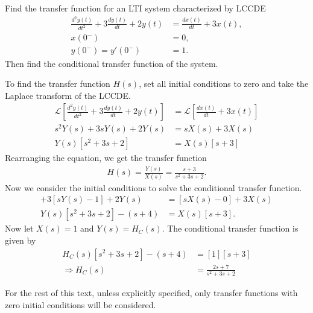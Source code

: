 \documentclass{report}
\begin{document}
\begin{example}
    Find the transfer function for an LTI system characterized by LCCDE
    \begin{align*}
        \frac{d^2y(t)}{dt^2} + 3\frac{dy(t)}{dt} + 2y(t) &= \frac{dx(t)}{dt} + 3x(t), \\
        x(0^-) &= 0, \\
        y(0^-)=y'(0^-) &= 1.
    \end{align*}
    Then find the conditional transfer function of the system.
\end{example}
\begin{solution}
    To find the transfer function $H(s)$, set all initial conditions to zero and take the Laplace transform of the LCCDE.
    \begin{align*}
        \mathcal{L}\left[\frac{d^2y(t)}{dt^2} + 3\frac{dy(t)}{dt} + 2y(t)\right] &= \mathcal{L}\left[\frac{dx(t)}{dt} + 3x(t)\right] \\
        s^2Y(s)+3sY(s)+2Y(s) &= sX(s) + 3X(s) \\
        Y(s)[s^2+3s+2] &= X(s)[s+3]
    \end{align*}
    Rearranging the equation, we get the transfer function
    \begin{align*}
        H(s) = \frac{Y(s)}{X(s)} = \frac{s+3}{s^2+3s+2}.
    \end{align*}
    Now we consider the initial conditions to solve the conditional transfer function.
    \begin{align*}
        [s^2Y(s)-s-1]+3[sY(s)-1]+2Y(s) &= [sX(s)-0] + 3X(s) \\ 
        Y(s)[s^2+3s+2] - (s+4) &= X(s)[s+3].
    \end{align*}
    Now let $X(s)=1$ and $Y(s)=H_C(s)$. The conditional transfer function is given by 
    \begin{align*}
        H_C(s)[s^2+3s+2] - (s+4) &= [1][s+3] \\
        \Longrightarrow H_C(s) &= \frac{2s+7}{s^2+3s+2}
    \end{align*}
\end{solution}

For the rest of this text, unless explicitly specified, only transfer functions with zero initial conditions will be considered.
\end{document}
